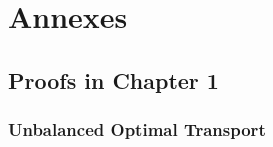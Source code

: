 \chapter[Annexes]{Annexes}

\localtableofcontents



\section{Proofs in Chapter 1}

\subsection{Unbalanced Optimal Transport}

